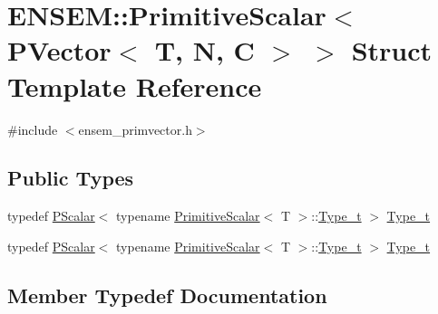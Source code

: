 \hypertarget{structENSEM_1_1PrimitiveScalar_3_01PVector_3_01T_00_01N_00_01C_01_4_01_4}{}\section{E\+N\+S\+EM\+:\+:Primitive\+Scalar$<$ P\+Vector$<$ T, N, C $>$ $>$ Struct Template Reference}
\label{structENSEM_1_1PrimitiveScalar_3_01PVector_3_01T_00_01N_00_01C_01_4_01_4}


{\ttfamily \#include $<$ensem\+\_\+primvector.\+h$>$}

\subsection*{Public Types}
\begin{DoxyCompactItemize}
\item 
typedef \mbox{\hyperlink{classENSEM_1_1PScalar}{P\+Scalar}}$<$ typename \mbox{\hyperlink{structENSEM_1_1PrimitiveScalar}{Primitive\+Scalar}}$<$ T $>$\+::\mbox{\hyperlink{structENSEM_1_1PrimitiveScalar_3_01PVector_3_01T_00_01N_00_01C_01_4_01_4_afc0dde305bcae3b52f619989d06ed843}{Type\+\_\+t}} $>$ \mbox{\hyperlink{structENSEM_1_1PrimitiveScalar_3_01PVector_3_01T_00_01N_00_01C_01_4_01_4_afc0dde305bcae3b52f619989d06ed843}{Type\+\_\+t}}
\item 
typedef \mbox{\hyperlink{classENSEM_1_1PScalar}{P\+Scalar}}$<$ typename \mbox{\hyperlink{structENSEM_1_1PrimitiveScalar}{Primitive\+Scalar}}$<$ T $>$\+::\mbox{\hyperlink{structENSEM_1_1PrimitiveScalar_3_01PVector_3_01T_00_01N_00_01C_01_4_01_4_afc0dde305bcae3b52f619989d06ed843}{Type\+\_\+t}} $>$ \mbox{\hyperlink{structENSEM_1_1PrimitiveScalar_3_01PVector_3_01T_00_01N_00_01C_01_4_01_4_afc0dde305bcae3b52f619989d06ed843}{Type\+\_\+t}}
\end{DoxyCompactItemize}


\subsection{Member Typedef Documentation}
\mbox{\label{structENSEM_1_1PrimitiveScalar_3_01PVector_3_01T_00_01N_00_01C_01_4_01_4_afc0dde305bcae3b52f619989d06ed843}} 

